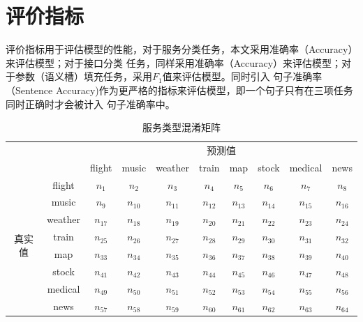 \section{评价指标}
评价指标用于评估模型的性能，对于服务分类任务，本文采用准确率（Accuracy）来评估模型；对于接口分类
任务，同样采用准确率（Accuracy）来评估模型；对于参数（语义槽）填充任务，采用$F_1$值来评估模型。同时引入
句子准确率（Sentence Accuracy)作为更严格的指标来评估模型，即一个句子只有在三项任务同时正确时才会被计入
句子准确率中。

 \begin{table}[htb]
      \centering
      \caption{服务类型混淆矩阵}
      \label{tab:hunxiao}
  \begin{tabular}{|c|c|c|c|c|c|c|c|c|c|}
    \hline
    \multicolumn{2}{|c|}{\multirow{2}{*}{}}&
    \multicolumn{8}{c|}{预测值}\\
    \cline{3-10}
    \multicolumn{2}{|c|}{}&flight & music & weather & train & map &stock &medical & news \\
     \hline
     \multirow{8}{*}{真实值}&
     flight&$n_1$&$n_2$&$n_3$&$n_4$&$n_5$&$n_6$&$n_7$&$n_8$\\
     \cline{2-10}
     \multicolumn{1}{|c|}{}&music&$n_{9}$&$n_{10}$&$n_{11}$&$n_{12}$&$n_{13}$&$n_{14}$&$n_{15}$&$n_{16}$\\
     \cline{2-10}
     \multicolumn{1}{|c|}{}&weather&$n_{17}$&$n_{18}$&$n_{19}$&$n_{20}$&$n_{21}$&$n_{22}$&$n_{23}$&$n_{24}$\\
     \cline{2-10}
     \multicolumn{1}{|c|}{}&train&$n_{25}$&$n_{26}$&$n_{27}$&$n_{28}$&$n_{29}$&$n_{30}$&$n_{31}$&$n_{32}$\\
     \cline{2-10}
     \multicolumn{1}{|c|}{}&map&$n_{33}$&$n_{34}$&$n_{35}$&$n_{36}$&$n_{37}$&$n_{38}$&$n_{39}$&$n_{40}$\\
     \cline{2-10}
     \multicolumn{1}{|c|}{}&stock&$n_{41}$&$n_{42}$&$n_{43}$&$n_{44}$&$n_{45}$&$n_{46}$&$n_{47}$&$n_{48}$\\
     \cline{2-10}
     \multicolumn{1}{|c|}{}&medical&$n_{49}$&$n_{50}$&$n_{51}$&$n_{52}$&$n_{53}$&$n_{54}$&$n_{55}$&$n_{56}$\\
     \cline{2-10}
     \multicolumn{1}{|c|}{}&news&$n_{57}$&$n_{58}$&$n_{59}$&$n_{60}$&$n_{61}$&$n_{62}$&$n_{63}$&$n_{64}$\\
    \hline
    \end{tabular}
  \end{table}

